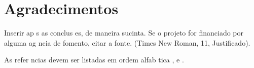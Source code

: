 \documentclass{article}
\begin{document}
\section*{Agradecimentos}

Inserir ap s as conclus es, de maneira sucinta. Se o projeto for financiado por alguma ag ncia de fomento, citar a fonte. (Times New Roman, 11, Justificado).




As refer ncias devem ser listadas em ordem alfab tica \cite{galvani}, \cite{national_instruments} e \cite{pandorfi}. 



\end{document}
